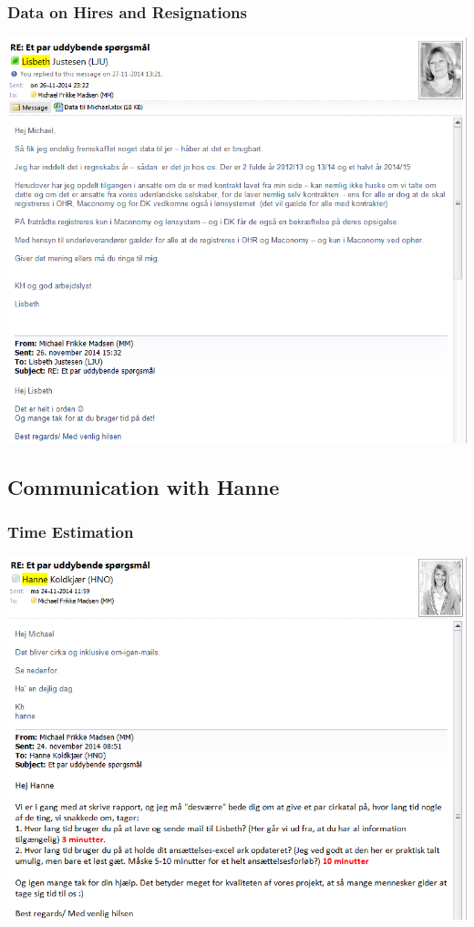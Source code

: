 \subsubsection{Data on Hires and Resignations}
\includegraphics[width=1.36\textwidth]{appendix/lisbeth_communication_2}


\subsection{Communication with Hanne}

\subsubsection{Time Estimation}
\includegraphics[width=1.36\textwidth]{appendix/hanne_communication_1}


